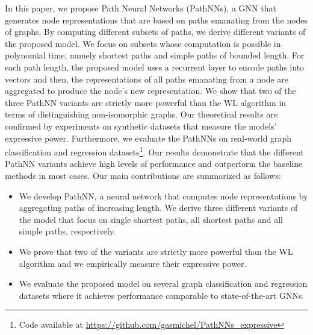\documentclass{article}
\theoremstyle{plain}
\theoremstyle{definition}
\theoremstyle{remark}
\begin{document}
In this paper, we propose Path Neural Networks (PathNNs), a GNN that generates node representations that are based on paths emanating from the nodes of graphs.
By computing different subsets of paths, we derive different variants of the proposed model.
We focus on subsets whose computation is possible in polynomial time, namely shortest paths and simple paths of bounded length.
For each path length, the proposed model uses a recurrent layer to encode paths into vectors and then, the representations of all paths emanating from a node are aggregated to produce the node's new representation.
We show that two of the three PathNN variants are strictly more powerful than the WL algorithm in terms of distinguishing non-isomorphic graphs.
Our theoretical results are confirmed by experiments on synthetic datasets that measure the models' expressive power.
Furthermore, we evaluate the PathNNs on real-world graph classification and regression datasets\footnote{Code available at \url{https://github.com/gasmichel/PathNNs_expressive}}.
Our results demonstrate that the different PathNN variants achieve high levels of performance and outperform the baseline methods in most cases.
Our main contributions are summarized as follows:
\begin{itemize}
    \item We develop PathNN, a neural network that computes node representations by aggregating paths of increasing length. 
    We derive three different variants of the model that focus on single shortest paths, all shortest paths and all simple paths, respectively.
    \item We prove that two of the variants are strictly more powerful than the WL algorithm and we empirically measure their expressive power.
    \item We evaluate the proposed model on several graph classification and regression datasets where it achieves performance comparable to state-of-the-art GNNs.
\end{itemize}
\end{document}
